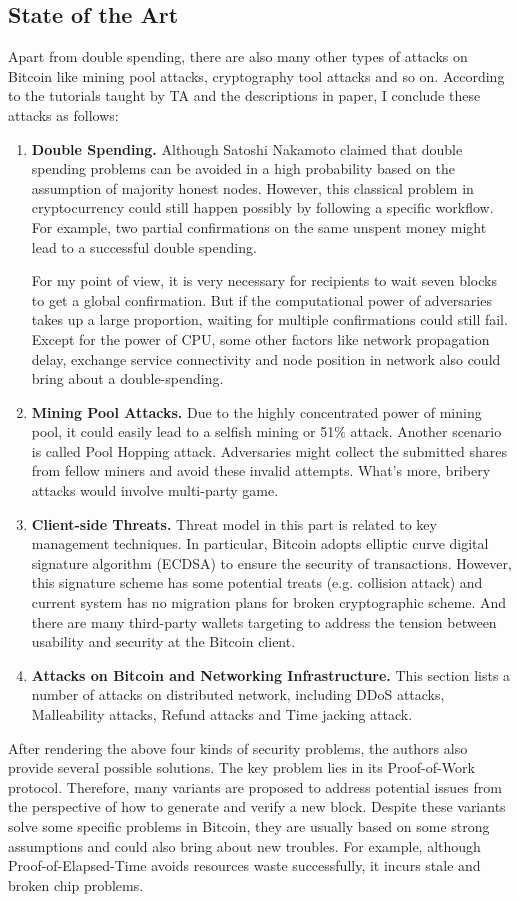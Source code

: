 \documentclass[conference]{IEEEtran}
\begin{document}
\subsection{State of the Art}
Apart from double spending, there are also many other types of attacks on Bitcoin like mining pool attacks, cryptography tool attacks and so on.
%
According to the tutorials taught by TA and the descriptions in paper, I conclude these attacks as follows:
%
\begin{enumerate}[label=(\roman*)]
   \item  \textbf{Double Spending.} Although Satoshi Nakamoto claimed that double spending problems can be avoided in a high probability based on the assumption of majority honest nodes.
   However, this classical problem in cryptocurrency could still happen possibly by following a specific workflow.
   For example, two partial confirmations on the same unspent money might lead to a successful double spending. 
   
   For my point of view, it is very necessary for recipients to wait seven blocks to get a global confirmation.
   But if the computational power of adversaries takes up a large proportion, waiting for multiple confirmations could still fail.
   Except for the power of CPU, some other factors like network propagation delay, exchange service connectivity and node position in network also could bring about a double-spending.
   \item  \textbf{Mining Pool Attacks.} Due to the highly concentrated power of mining pool, it could easily lead to a selfish mining or 51$\%$ attack.
   Another scenario is called Pool Hopping attack. Adversaries might collect the submitted shares from fellow miners and avoid these invalid attempts.
   What's more, bribery attacks would involve multi-party game.
   \item \textbf{Client-side Threats.} Threat model in this part is related to key management techniques.
   In particular, Bitcoin adopts elliptic curve digital signature algorithm (ECDSA) to ensure the security of transactions.
   However, this signature scheme has some potential treats (e.g. collision attack) and current system has no migration plans for broken cryptographic scheme.
   And there are many third-party wallets targeting to address the tension between usability and security at the Bitcoin client.  
   \item \textbf{Attacks on Bitcoin and Networking Infrastructure.} 
   This section lists a number of attacks on distributed network, including DDoS attacks, Malleability attacks, Refund attacks and Time jacking attack.
\end{enumerate}
%
After rendering the above four kinds of security problems, the authors also provide several possible solutions. 
%
The key problem lies in its Proof-of-Work protocol. 
%
Therefore, many variants are proposed to address potential issues from the perspective of how to generate and verify a new block.
%
Despite these variants solve some specific problems in Bitcoin, they are usually based on some strong assumptions and could also bring about new troubles.
%
For example, although Proof-of-Elapsed-Time avoids resources waste successfully, it incurs stale and broken chip problems.
\end{document}

